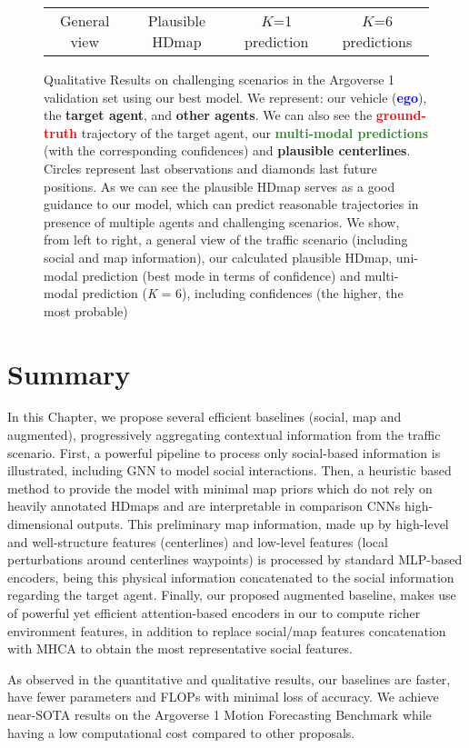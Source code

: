 \begin{figure}[h]
\begin{tabular}{cccc}
		\tabularnewline
		
		General view & Plausible \ac{HDmap} & $K$=1 prediction & $K$=6 predictions \tabularnewline
	\end{tabular}
	\captionsetup{justification=justified}
	\caption[Qualitative Results on challenging scenarios in the Argoverse 1 validation set using our best model]{Qualitative Results on challenging scenarios in the Argoverse 1 validation set using our best model.	We represent: our vehicle (\textbf{\textcolor{blue}{ego}}), the \textbf{\textcolor{YellowOrange}{target agent}}, and \textbf{\textcolor{gray75}{other agents}}. We can also see the \textbf{\textcolor{red}{ground-truth}} trajectory of the target agent, our \textbf{\textcolor{ForestGreen}{multi-modal predictions}} (with the corresponding confidences) and \textbf{plausible centerlines}. Circles represent last observations and diamonds last future positions. As we can see the plausible \ac{HDmap} serves as a good guidance to our model, which can predict reasonable trajectories in presence of multiple agents and challenging scenarios. We show, from left to right, a general view of the traffic scenario (including social and map information), our calculated plausible \ac{HDmap}, uni-modal prediction (best mode in terms of confidence) and multi-modal prediction (\textit{K} = 6), including confidences (the higher, the most probable)}
	\label{fig:chapter_6_Efficient_Baselines/argoverse_1_qualitative_results}
\end{figure}

\section{Summary}
\label{sec:6_summary}

In this Chapter, we propose several efficient baselines (social, map and augmented), progressively aggregating contextual information from the traffic scenario. First, a powerful pipeline to process only social-based information is illustrated, including \ac{GNN} to model social interactions. Then, a heuristic based method to provide the model with minimal map priors which do not rely on heavily annotated \acp{HDmap} and are interpretable in comparison \acp{CNN} high-dimensional outputs. This preliminary map information, made up by high-level and well-structure features (centerlines) and low-level features (local perturbations around centerlines waypoints) is processed by standard \ac{MLP}-based encoders, being this physical information concatenated to the social information regarding the target agent. Finally, our proposed augmented baseline, makes use of powerful yet efficient attention-based encoders in our to compute richer environment features, in addition to replace social/map features concatenation with \ac{MHCA} to obtain the most representative social features.

As observed in the quantitative and qualitative results, our baselines are faster, have fewer parameters and \acp{FLOP} with minimal loss of accuracy. We achieve near-\ac{SOTA} results on the Argoverse 1 Motion Forecasting Benchmark while having a low computational cost compared to other proposals. 